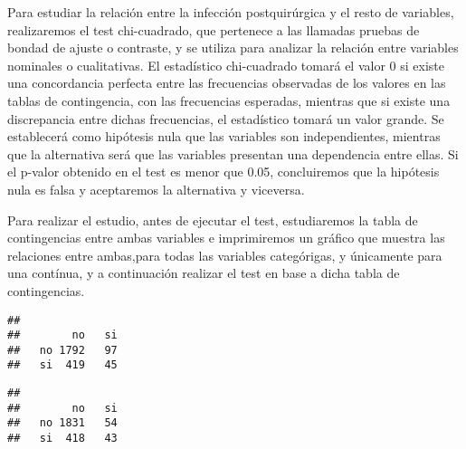 \documentclass[]{article}
\newenvironment{Shaded}{\begin{snugshade}}{\end{snugshade}}
\newcommand{\KeywordTok}[1]{\textcolor[rgb]{0.13,0.29,0.53}{\textbf{#1}}}
\newcommand{\NormalTok}[1]{#1}
\newcommand{\OperatorTok}[1]{\textcolor[rgb]{0.81,0.36,0.00}{\textbf{#1}}}
\newcommand{\StringTok}[1]{\textcolor[rgb]{0.31,0.60,0.02}{#1}}
\begin{document}
Para estudiar la relación entre la infección postquirúrgica y el resto
de variables, realizaremos el test chi-cuadrado, que pertenece a las
llamadas pruebas de bondad de ajuste o contraste, y se utiliza para
analizar la relación entre variables nominales o cualitativas. El
estadístico chi-cuadrado tomará el valor 0 si existe una concordancia
perfecta entre las frecuencias observadas de los valores en las tablas
de contingencia, con las frecuencias esperadas, mientras que si existe
una discrepancia entre dichas frecuencias, el estadístico tomará un
valor grande. Se establecerá como hipótesis nula que las variables son
independientes, mientras que la alternativa será que las variables
presentan una dependencia entre ellas. Si el p-valor obtenido en el test
es menor que 0.05, concluiremos que la hipótesis nula es falsa y
aceptaremos la alternativa y viceversa.

Para realizar el estudio, antes de ejecutar el test, estudiaremos la
tabla de contingencias entre ambas variables e imprimiremos un gráfico
que muestra las relaciones entre ambas,para todas las variables
categórigas, y únicamente para una contínua, y a continuación realizar
el test en base a dicha tabla de contingencias.

\begin{Shaded}
\end{Shaded}

\begin{verbatim}
##     
##        no   si
##   no 1792   97
##   si  419   45
\end{verbatim}

\begin{Shaded}
\end{Shaded}

\begin{verbatim}
##     
##        no   si
##   no 1831   54
##   si  418   43
\end{verbatim}
\end{document}
